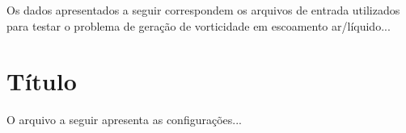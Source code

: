 \begin{center}
	\label{AnexoA}
\end{center}

Os dados apresentados a seguir correspondem os arquivos de entrada utilizados para testar o problema de geração de vorticidade em escoamento ar/líquido...\\

\section{Título}\label{AnexoA:1}

O arquivo a seguir apresenta as configurações...

\clearpage


